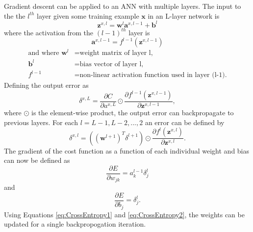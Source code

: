 Gradient descent can be applied to an ANN with multiple layers. The input to the the $l^{th}$ layer given some training example $\boldsymbol{x}$ in an L-layer network is 
\begin{equation}
\boldsymbol{z}^{x,l} = \boldsymbol{w}^{l}  \boldsymbol{a}^{x,l-1} + \boldsymbol{b}^{l}
\end{equation}
%
where the activation from the $(l-1)^{th}$ layer is
%
\begin{equation}
\boldsymbol{a}^{x,l-1} = f^{l-1}(\boldsymbol{z}^{x,l-1})
\end{equation}
\begin{align*}
  \text{and where } \boldsymbol{w}^{l} &= \text{weight matrix of layer l,} \\
  \boldsymbol{b}^{l} &= \text{bias vector of layer l,} \\
  f^{l-1} &= \text{non-linear activation function used in layer (l-1).}
\end{align*}
%
Defining the output error as 
%
\begin{equation}
\delta^{x,L} = \frac{\partial C}{\partial a^{x,L}} \odot \frac{\partial f^{l-1}(\boldsymbol{z}^{x,l-1}) }{\partial \boldsymbol{z}^{x,l-1}}, 
\end{equation}
%
where $\odot$ is the element-wise product, the output error can backpropagate to previous layers. For each $l=L-1,L-2,...,2$ an error can be defined by
%
\begin{equation}
\delta^{x,l} = ((\boldsymbol{w}^{l+1})^T \delta^{l+1}) \odot \frac{\partial f^{l}(\boldsymbol{z}^{x,l}) }{\partial \boldsymbol{z}^{x,l}}.
\end{equation}
%
The gradient of the cost function as a function of each individual weight and bias can now be defined as 
%
\begin{equation} \label{eq:CrossEntropy1}
\frac{\partial E}{\partial w_{jk}} = a^{l-1}_k \delta^l_j
\end{equation}
%
and 
%
\begin{equation} \label{eq:CrossEntropy2}
\frac{\partial E}{\partial b_j} = \delta^l_j.
\end{equation}
%
Using Equations \ref{eq:CrossEntropy1} and \ref{eq:CrossEntropy2}, the weights can be updated for a single backpropogation iteration. 




